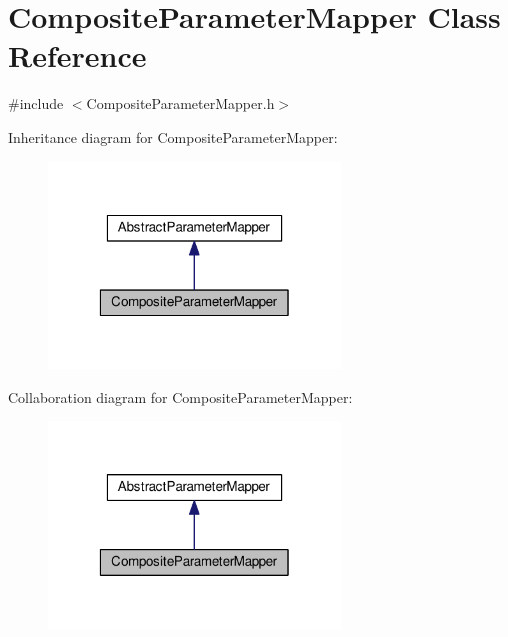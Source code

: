 \hypertarget{classCompositeParameterMapper}{}\section{Composite\+Parameter\+Mapper Class Reference}
\label{classCompositeParameterMapper}


{\ttfamily \#include $<$Composite\+Parameter\+Mapper.\+h$>$}



Inheritance diagram for Composite\+Parameter\+Mapper\+:\nopagebreak
\begin{figure}[H]
\begin{center}
\leavevmode
\includegraphics[width=220pt]{classCompositeParameterMapper__inherit__graph}
\end{center}
\end{figure}


Collaboration diagram for Composite\+Parameter\+Mapper\+:\nopagebreak
\begin{figure}[H]
\begin{center}
\leavevmode
\includegraphics[width=220pt]{classCompositeParameterMapper__coll__graph}
\end{center}
\end{figure}
